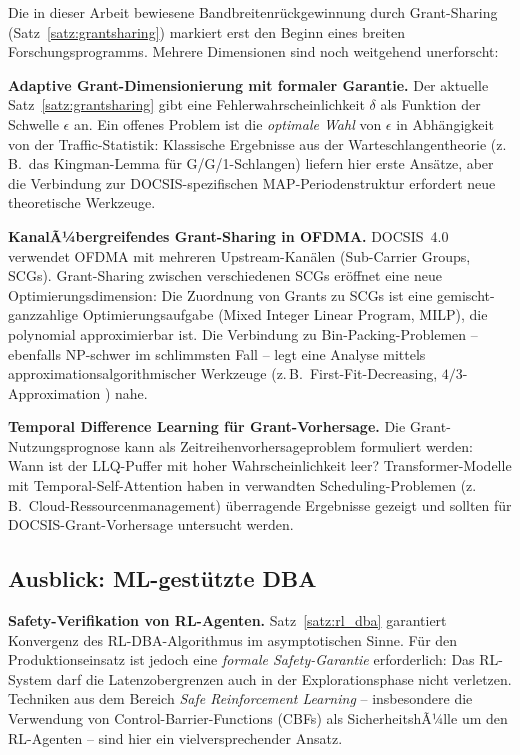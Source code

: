 ﻿\documentclass[a4paper,12pt]{article}
\theoremstyle{definition}
\begin{document}
Die in dieser Arbeit bewiesene Bandbreitenr\"{u}ckgewinnung durch Grant-Sharing
(Satz~\ref{satz:grantsharing}) markiert erst den Beginn eines breiten
Forschungsprogramms. Mehrere Dimensionen sind noch weitgehend unerforscht:

\textbf{Adaptive Grant-Dimensionierung mit formaler Garantie.}
Der aktuelle Satz~\ref{satz:grantsharing} gibt eine Fehlerwahrscheinlichkeit
$\delta$ als Funktion der Schwelle $\epsilon$ an. Ein offenes Problem ist die
\emph{optimale Wahl} von $\epsilon$ in Abh\"{a}ngigkeit von der Traffic-Statistik:
Klassische Ergebnisse aus der Warteschlangentheorie (z.\,B.\ das Kingman-Lemma
f\"{u}r G/G/1-Schlangen) liefern hier erste Ans\"{a}tze, aber die Verbindung zur
DOCSIS-spezifischen MAP-Periodenstruktur erfordert neue theoretische Werkzeuge.

\textbf{KanalÃ¼bergreifendes Grant-Sharing in OFDMA.}
DOCSIS~4.0 verwendet OFDMA mit mehreren Upstream-Kan\"{a}len (Sub-Carrier Groups,
SCGs). Grant-Sharing zwischen verschiedenen SCGs er\"{o}ffnet eine neue
Optimierungsdimension: Die Zuordnung von Grants zu SCGs ist eine gemischt-ganzzahlige
Optimierungsaufgabe (Mixed Integer Linear Program, MILP), die polynomial
approximierbar ist. Die Verbindung zu Bin-Packing-Problemen -- ebenfalls
NP-schwer im schlimmsten Fall -- legt eine Analyse mittels
approximationsalgorithmischer Werkzeuge (z.\,B.\ First-Fit-Decreasing,
$4/3$-Approximation \cite{garey1979computers}) nahe.

\textbf{Temporal Difference Learning f\"{u}r Grant-Vorhersage.}
Die Grant-Nutzungsprognose kann als Zeitreihenvorhersageproblem formuliert
werden: Wann ist der LLQ-Puffer mit hoher Wahrscheinlichkeit leer?
Transformer-Modelle mit Temporal-Self-Attention haben in verwandten
Scheduling-Problemen (z.\,B.\ Cloud-Ressourcenmanagement) \"{u}berragende Ergebnisse
gezeigt und sollten f\"{u}r DOCSIS-Grant-Vorhersage untersucht werden.

\subsection{Ausblick: ML-gest\"{u}tzte DBA}

\textbf{Safety-Verifikation von RL-Agenten.}
Satz~\ref{satz:rl_dba} garantiert Konvergenz des RL-DBA-Algorithmus im
asymptotischen Sinne. F\"{u}r den Produktionseinsatz ist jedoch eine \emph{formale
Safety-Garantie} erforderlich: Das RL-System darf die Latenzobergrenzen auch
in der Explorationsphase nicht verletzen. Techniken aus dem Bereich
\emph{Safe Reinforcement Learning} -- insbesondere die Verwendung von
Control-Barrier-Functions (CBFs) als SicherheitshÃ¼lle um den RL-Agenten --
sind hier ein vielversprechender Ansatz.
\end{document}
